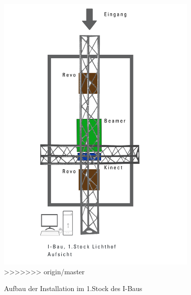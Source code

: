 \begin{figure}[htbp]
		\includegraphics[width=0.88\textwidth]{images/ModelFirstFloor.png}
>>>>>>> origin/master
	\caption{Aufbau der Installation im 1.Stock des I-Baus}
	\label{fig:ModelFF}
\end{figure}

